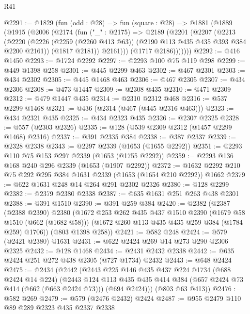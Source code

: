 \begin{lexlean}{R41}
\begin{coremodule}
@2291 := @1829
    (fun (odd : @28) =>
    fun (square : @28) =>
    @1881
      (@1889
        (@1915
          (@2006
            (@2174
              (fun ("_" : @2175) =>
              @2189
                (@2201
                  (@2207
                    (@2213
                      (@2220
                        (@2226
                          (@2259 (@2260 @413 @63))
                          (@2190 @113 @435 @435 @393 @384 @2200 @2161))
                        (@1817 @2181))
                      @2161)))
                (@1717 @2186)))))))
@2292 := @416 @1450
@2293 := @1724 @2292
@2297 := @2293 @100 @75 @119 @298
@2299 := @449 @1398 @258
@2301 := @445 @2299 @463
@2302 := @467 @2301
@2303 := @434 @2302
@2305 := @445 @1468 @463
@2306 := @467 @2305
@2307 := @434 @2306
@2308 := @473 @1447
@2309 := @2308 @435
@2310 := @471 @2309
@2312 := @479 @1447 @435
@2314 := @2310 @2312 @468
@2316 := @537 @2299 @1468
@2321 := @436 (@2314 (@467 (@445 @2316 @463)))
@2323 := @434 @2321 @435
@2325 := @434 @2323 @435
@2326 := @2307 @2325
@2328 := @557 (@2303 @2326)
@2335 := @128 (@539 @2309 @2312 (@1457 @2299 @1468) @2316)
@2337 := @391 @2335 @384
@2338 := @387 @2337
@2339 := @2328 @2338
@2343 := @2297 @2339 (@1653 (@1655 @2292))
@2351 := @2293 @110 @75 @153 @297 @2339 (@1653 (@1755 @2292))
@2359 := @2293 @136 @168 @240 @296 @2339 (@1653 (@1907 @2292))
@2372 := @1632 @2292 @210 @75 @292 @295 @384 @1631 @2339 (@1653 (@1654 @210 @2292)) @1662
@2379 := @622 @1631 @248 @14 @264 @291 @2302 @2326
@2380 := @128 @2299
@2382 := @2379 @2380 @2338
@2387 := @635 @1631 @251 @263 @438 @2301
@2388 := @391 @1510
@2390 := @391 @259 @384
@2420 := @2382
    (@2387
      (@2388 @2390)
      @2380
      (@1672
        @253
        @262
        @435
        @437
        @1510
        @2390
        (@1679 @58 @1510 (@662 (@1682 @58)))
        (@1672 @260 @113 @435 @435 @259 @384 (@1784 @259) @1706))
      (@803 @1398 @258))
@2421 := @582 @248
@2424 := @579 (@2421 @2380) @1631
@2431 := @622 @2424 @269 @14 @273 @290 @2306 @2325
@2432 := @128 @1468
@2434 := @2431 @2432 @2338
@2442 := @635 @2424 @251 @272 @438 @2305 (@727 @1734) @2432
@2443 := @648 @2424
@2475 := @2434
    (@2442
      (@2443
        @225
        @146
        @435
        @437
        @224
        @1734
        (@688 @2424 @14 @224)
        (@2443
          @124
          @113
          @435
          @435
          @414
          @384
          (@657 @2424 @73 @414 (@662 (@663 @2424 @73)))
          (@694 @2424)))
      (@803 @63 @413))
@2476 := @582 @269
@2479 := @579 (@2476 @2432) @2424
@2487 := @955 @2479 @110 @89 @289 @2323 @435 @2337 @2338

\end{coremodule}
\end{lexlean}
